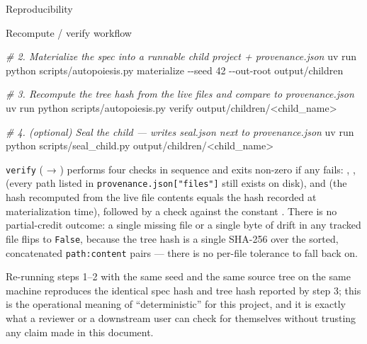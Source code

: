 \documentclass[
  ignorenonframetext,
]{beamer}
\newenvironment{Shaded}{}{}
\newcommand{\AttributeTok}[1]{\textcolor[rgb]{0.49,0.56,0.16}{#1}}
\newcommand{\CommentTok}[1]{\textcolor[rgb]{0.38,0.63,0.69}{\textit{#1}}}
\newcommand{\ExtensionTok}[1]{#1}
\newcommand{\NormalTok}[1]{#1}
\newcommand{\OperatorTok}[1]{\textcolor[rgb]{0.40,0.40,0.40}{#1}}
\begin{document}
\begin{frame}{Reproducibility}
\begin{block}{Recompute / verify workflow}
\begin{Shaded}
\begin{Highlighting}[]
\CommentTok{\# 2. Materialize the spec into a runnable child project + provenance.json}
\ExtensionTok{uv}\NormalTok{ run python scripts/autopoiesis.py materialize }\AttributeTok{{-}{-}seed}\NormalTok{ 42 }\AttributeTok{{-}{-}out{-}root}\NormalTok{ output/children}

\CommentTok{\# 3. Recompute the tree hash from the live files and compare to provenance.json}
\ExtensionTok{uv}\NormalTok{ run python scripts/autopoiesis.py verify output/children/}\OperatorTok{\textless{}}\NormalTok{child\_name}\OperatorTok{\textgreater{}}

\CommentTok{\# 4. (optional) Seal the child — writes seal.json next to provenance.json}
\ExtensionTok{uv}\NormalTok{ run python scripts/seal\_child.py output/children/}\OperatorTok{\textless{}}\NormalTok{child\_name}\OperatorTok{\textgreater{}}
\end{Highlighting}
\end{Shaded}

\texttt{verify} ( →
) performs four checks in
sequence and exits non-zero if any fails: ,
,  (every path
listed in \texttt{provenance.json{[}"files"{]}} still exists on disk),
and  (the hash recomputed from the live file
contents equals the hash recorded at materialization time), followed by
a  check against the constant
. There is no partial-credit
outcome: a single missing file or a single byte of drift in any tracked
file flips  to \texttt{False}, because the
tree hash is a single SHA-256 over the sorted, concatenated
\texttt{path:content} pairs --- there is no per-file tolerance to fall
back on.

Re-running steps 1--2 with the same seed and the same source tree on the
same machine reproduces the identical spec hash and tree hash reported
by step 3; this is the operational meaning of ``deterministic'' for this
project, and it is exactly what a reviewer or a downstream user can
check for themselves without trusting any claim made in this document.
\end{block}


\end{frame}
\end{document}
